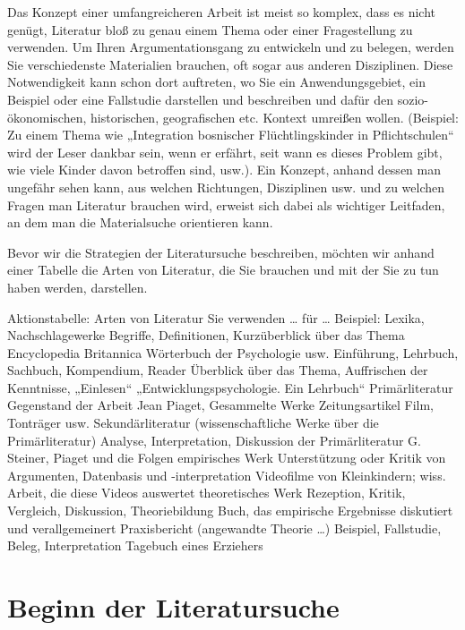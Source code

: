 \documentclass[]{book}
\theoremstyle{definition}
\theoremstyle{definition}
\theoremstyle{definition}
\theoremstyle{remark}
\begin{document}
Das Konzept einer umfangreicheren Arbeit ist meist so komplex, dass es
nicht genügt, Literatur bloß zu genau einem Thema oder einer
Fragestellung zu verwenden. Um Ihren Argumentationsgang zu entwickeln
und zu belegen, werden Sie verschiedenste Materialien brauchen, oft
sogar aus anderen Disziplinen. Diese Notwendigkeit kann schon dort
auftreten, wo Sie ein Anwendungsgebiet, ein Beispiel oder eine
Fallstudie darstellen und beschreiben und dafür den sozio-ökonomischen,
historischen, geografischen etc. Kontext umreißen wollen. (Beispiel: Zu
einem Thema wie „Integration bosnischer Flüchtlingskinder in
Pflichtschulen`` wird der Leser dankbar sein, wenn er erfährt, seit wann
es dieses Problem gibt, wie viele Kinder davon betroffen sind, usw.).
Ein Konzept, anhand dessen man ungefähr sehen kann, aus welchen
Richtungen, Disziplinen usw. und zu welchen Fragen man Literatur
brauchen wird, erweist sich dabei als wichtiger Leitfaden, an dem man
die Materialsuche orientieren kann.

Bevor wir die Strategien der Literatursuche beschreiben, möchten wir
anhand einer Tabelle die Arten von Literatur, die Sie brauchen und mit
der Sie zu tun haben werden, darstellen.

Aktionstabelle: Arten von Literatur Sie verwenden \ldots{} für \ldots{}
Beispiel: Lexika, Nachschlagewerke Begriffe, Definitionen, Kurzüberblick
über das Thema Encyclopedia Britannica Wörterbuch der Psychologie usw.
Einführung, Lehrbuch, Sachbuch, Kompendium, Reader Überblick über das
Thema, Auffrischen der Kenntnisse, „Einlesen`` „Entwicklungspsychologie.
Ein Lehrbuch`` Primärliteratur Gegenstand der Arbeit Jean Piaget,
Gesammelte Werke Zeitungsartikel Film, Tonträger usw. Sekundärliteratur
(wissenschaftliche Werke über die Primärliteratur) Analyse,
Interpretation, Diskussion der Primärliteratur G. Steiner, Piaget und
die Folgen empirisches Werk Unterstützung oder Kritik von Argumenten,
Datenbasis und -interpretation Videofilme von Kleinkindern; wiss.
Arbeit, die diese Videos auswertet theoretisches Werk Rezeption, Kritik,
Vergleich, Diskussion, Theoriebildung Buch, das empirische Ergebnisse
diskutiert und verallgemeinert Praxisbericht (angewandte Theorie
\ldots{}) Beispiel, Fallstudie, Beleg, Interpretation Tagebuch eines
Erziehers

\section{Beginn der Literatursuche}\label{beginn-der-literatursuche}
\end{document}
